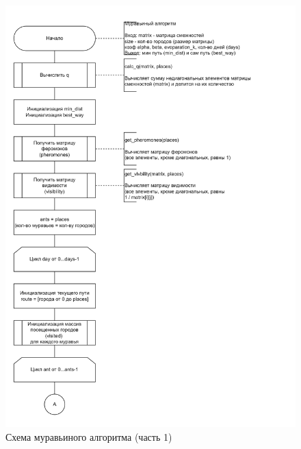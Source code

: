 \begin{figure}[h]
	\centering
	\includegraphics[height=0.9\textheight]{img/ants-1.png}
	\caption{Схема муравьиного алгоритма (часть 1)}
	\label{fig:ants-1}
\end{figure}

